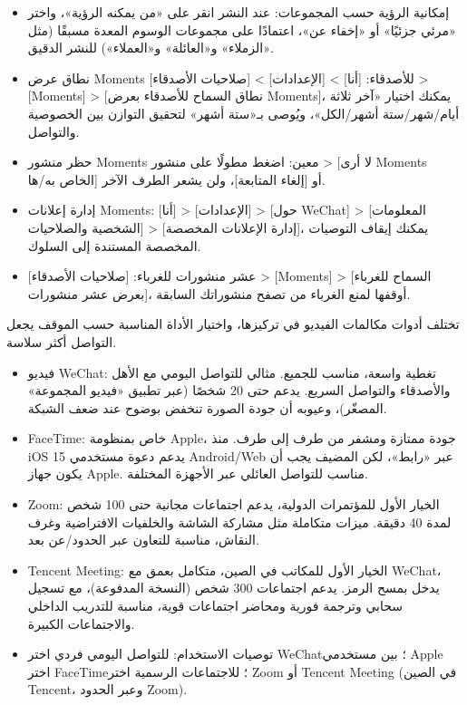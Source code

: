 
\begin{itemize}
  \item إمكانية الرؤية حسب المجموعات: عند النشر انقر على «من يمكنه الرؤية»، واختر «مرئي جزئيًا» أو «إخفاء عن»، اعتمادًا على مجموعات الوسوم المعدة مسبقًا (مثل «الزملاء» و«العائلة» و«العملاء») للنشر الدقيق.
  \item نطاق عرض Moments للأصدقاء: [أنا] > [الإعدادات] > [صلاحيات الأصدقاء] > [Moments] > [نطاق السماح للأصدقاء بعرض Moments]، يمكنك اختيار «آخر ثلاثة أيام/شهر/ستة أشهر/الكل»، ويُوصى بـ«ستة أشهر» لتحقيق التوازن بين الخصوصية والتواصل.
  \item حظر منشور Moments معين: اضغط مطولًا على منشور > [لا أرى Moments الخاص به/ها] أو [إلغاء المتابعة]، ولن يشعر الطرف الآخر.
  \item إدارة إعلانات Moments: [أنا] > [الإعدادات] > [حول WeChat] > [المعلومات الشخصية والصلاحيات] > [إدارة الإعلانات المخصصة]، يمكنك إيقاف التوصيات المخصصة المستندة إلى السلوك.
  \item عشر منشورات للغرباء: [صلاحيات الأصدقاء] > [Moments] > [السماح للغرباء بعرض عشر منشورات]، أوقفها لمنع الغرباء من تصفح منشوراتك السابقة.
\end{itemize}


تختلف أدوات مكالمات الفيديو في تركيزها، واختيار الأداة المناسبة حسب الموقف يجعل التواصل أكثر سلاسة.

\begin{itemize}
  \item فيديو WeChat: تغطية واسعة، مناسب للجميع. مثالي للتواصل اليومي مع الأهل والأصدقاء والتواصل السريع. يدعم حتى 20 شخصًا (عبر تطبيق «فيديو المجموعة» المصغّر)، وعيوبه أن جودة الصورة تنخفض بوضوح عند ضعف الشبكة.
  \item FaceTime: خاص بمنظومة Apple، جودة ممتازة ومشفر من طرف إلى طرف. منذ iOS 15 يدعم دعوة مستخدمي Android/Web عبر «رابط»، لكن المضيف يجب أن يكون جهاز Apple. مناسب للتواصل العائلي عبر الأجهزة المختلفة.
  \item Zoom: الخيار الأول للمؤتمرات الدولية، يدعم اجتماعات مجانية حتى 100 شخص لمدة 40 دقيقة. ميزات متكاملة مثل مشاركة الشاشة والخلفيات الافتراضية وغرف النقاش، مناسبة للتعاون عبر الحدود/عن بعد.
  \item Tencent Meeting: الخيار الأول للمكاتب في الصين، متكامل بعمق مع WeChat، يدخل بمسح الرمز. يدعم اجتماعات 300 شخص (النسخة المدفوعة)، مع تسجيل سحابي وترجمة فورية ومحاضر اجتماعات قوية، مناسبة للتدريب الداخلي والاجتماعات الكبيرة.
  \item توصيات الاستخدام: للتواصل اليومي فردي اختر WeChat؛ بين مستخدمي Apple اختر FaceTime؛ للاجتماعات الرسمية اختر Zoom أو Tencent Meeting (في الصين Tencent، وعبر الحدود Zoom).
\end{itemize}

